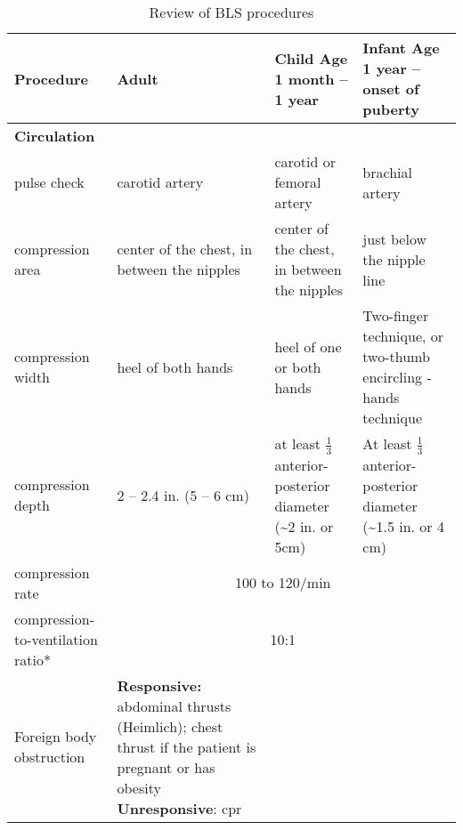 \documentclass[../../EMT-169.tex]{subfiles}
\begin{document}
\begin{table}[ht]
	\centering
	\caption{Review of BLS procedures}
	
	\bgroup
	\def\arraystretch{1.25}%
	\begin{tabular}{|p{3cm}|p{4cm}|p{4cm}|p{4cm}|}
		\hline
		\bfseries Procedure						 & \bfseries Adult                                        & \textbf{Child} \newline \small {Age 1 month -- 1 year} 					   			
																																						    &  \textbf{Infant} \newline \small {Age 1 year -- onset of \newline puberty} \\ \hline \hline
		\multicolumn{4}{l}{\bfseries Circulation} \\ \hline
		pulse check                              & carotid artery                                         & carotid or femoral artery 		   				& brachial artery \\ \hline
		compression area                         & center of the chest, in between the nipples     		  & center of the chest, in between the nipples 	& just below the nipple line \\ \hline
		compression width						 & heel of both hands									  & heel of one or both hands 						& Two-finger technique, \newline or two-thumb encircling \newline-hands technique \\ \hline
		compression depth                        & 2 -- 2.4 in. \newline (5 -- 6 cm)                      & at least \( \frac{1}{3} \) anterior-posterior diameter \newline (\textasciitilde 2 in. or 5cm) 
																																							& At least \( \frac{1}{3} \) anterior-posterior diameter \newline (\textasciitilde 1.5 in. or 4 cm) \\ \hline
		compression rate                         & \multicolumn{3}{c|}{100 to 120/min} \\ \hline
		compression-to-ventilation ratio*        & \multicolumn{3}{c|}{10:1}  \\ \hline
		Foreign body \newline obstruction        & \textbf{Responsive:} \newline abdominal thrusts (Heimlich); \newline chest thrust if the \newline patient is pregnant or has obesity \newline  \textbf{Unresponsive}: \acrshort{cpr} 

\end{tabular}
\end{table}
\end{document}
